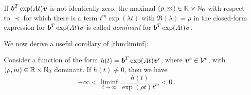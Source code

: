 \begin{definition}
If $\boldsymbol{b}^{T}\exp(At)\boldsymbol{v}$ is not identically zero,
the maximal $(\rho,m)\in\mathbb{R}\times\mathbb{N}_{0}$ with respect
to $\prec$ for which there is a term $t^{m}\exp (\lambda t)$ with
$\Re(\lambda)=\rho$ in the closed-form expression for
$\boldsymbol{b}^{T}\exp(At)\boldsymbol{v}$ is called \emph{dominant} for
$\boldsymbol{b}^{T}\exp(At)\boldsymbol{v}$.
\end{definition}

We now derive a useful corollary of \cref{thm:liminf}:

\begin{corollary}
\label{cor:liminf}
Consider a function of the form $h(t)=\boldsymbol{b}^{T}\exp(At) \boldsymbol{v}^{c}$, where $\boldsymbol{v}^{c}\in\mathcal{V}^{c}$, with $(\rho,m)\in\mathbb{R}\times \mathbb{N}_{0}$ dominant. If $h(t)\not\equiv 0$, then we have
\begin{equation*}
-\infty<\liminf\limits_{t\rightarrow\infty} \frac{h(t)}{\exp(\rho
  t)t^{m}}<0 \, .
\end{equation*}
\end{corollary}

